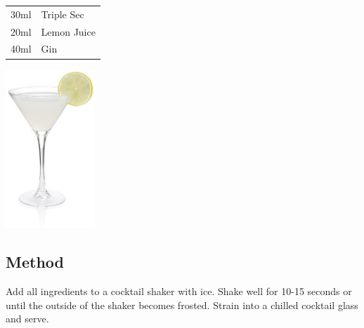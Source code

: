 \documentclass[12pt, letterpaper]{article}
\begin{document}
\begin{multicols}{2}

\begin{tabular} { r | l}
    30ml & Triple Sec \\
    20ml & Lemon Juice \\
    40ml & Gin
\end{tabular}

\includegraphics[height=6cm]{whitelady}

\end{multicols}

\subsection*{Method}
Add all ingredients to a cocktail shaker with ice.
Shake well for 10-15 seconds or until the outside of the shaker becomes frosted.
Strain into a chilled cocktail glass and serve.
\end{document}
